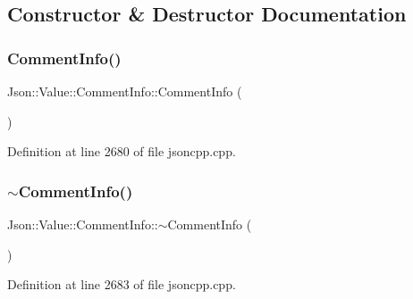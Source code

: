 \subsection{Constructor \& Destructor Documentation}
\hypertarget{struct_json_1_1_value_1_1_comment_info_ab23b0c125695d284bded2fb106a49043}{}\label{struct_json_1_1_value_1_1_comment_info_ab23b0c125695d284bded2fb106a49043} 
\subsubsection{\texorpdfstring{Comment\+Info()}{CommentInfo()}\hspace{0.1cm}{\footnotesize\ttfamily [1/2]}}
{\footnotesize\ttfamily Json\+::\+Value\+::\+Comment\+Info\+::\+Comment\+Info (\begin{DoxyParamCaption}{ }\end{DoxyParamCaption})}



Definition at line 2680 of file jsoncpp.\+cpp.

\hypertarget{struct_json_1_1_value_1_1_comment_info_ab4d0877190bdbf484e4e2a3bade42ac8}{}\label{struct_json_1_1_value_1_1_comment_info_ab4d0877190bdbf484e4e2a3bade42ac8} 
\subsubsection{\texorpdfstring{$\sim$\+Comment\+Info()}{~CommentInfo()}\hspace{0.1cm}{\footnotesize\ttfamily [1/2]}}
{\footnotesize\ttfamily Json\+::\+Value\+::\+Comment\+Info\+::$\sim$\+Comment\+Info (\begin{DoxyParamCaption}{ }\end{DoxyParamCaption})}



Definition at line 2683 of file jsoncpp.\+cpp.

\hypertarget{struct_json_1_1_value_1_1_comment_info_ab23b0c125695d284bded2fb106a49043}{}\label{struct_json_1_1_value_1_1_comment_info_ab23b0c125695d284bded2fb106a49043} 
